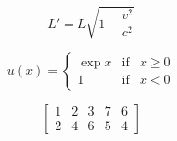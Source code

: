 \documentclass[11pt,a4paper]{article}  %
\begin{document}
\begin{equation*}
\label{eqn:somelabel}
L'=L \sqrt{1-\frac{v^2}{c^2}}
\end{equation*}

\begin{equation*}
u(x)= \left\{ \begin{array}{llcc}
  \exp x & \mbox{if} & x \geq 0
  \\
  1  & \mbox{if} & x < 0
\end{array}\right.
\end{equation*}

\begin{equation}
\left[
\begin{array}{ccc|cc}
     1& 2&3 &7 & 6\\\hline
     2& 4& 6&5 &4
\end{array}
\right]
\end{equation}
\end{document}
